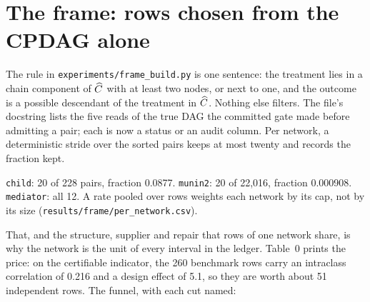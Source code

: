\section{The frame: rows chosen from the CPDAG alone}\label{sec:frame-rule}

The rule in \texttt{experiments/frame\_build.py} is one sentence: the treatment lies in a chain
component of $\widehat{C}$ with at least two nodes, or next to one, and the outcome is a possible descendant
of the treatment in $\widehat{C}$. Nothing else filters. The file's docstring lists the five reads of the
true DAG the committed gate made before admitting a pair; each is now a status or an audit column.
Per network, a deterministic stride over the sorted pairs keeps at most twenty and records the
fraction kept.

\begin{exemplo}
\texttt{child}: 20 of 228 pairs, fraction 0.0877. \texttt{munin2}: 20 of 22,016, fraction 0.000908.
\texttt{mediator}: all 12. A rate pooled over rows weights each network by its cap, not by its size
(\texttt{results/frame/per\_network.csv}).
\end{exemplo}

That, and the structure, supplier and repair that rows of one network share, is why the network is
the unit of every interval in the ledger. Table~0 prints the price: on the certifiable indicator, the 260
benchmark rows carry an intraclass correlation of 0.216 and a design effect of 5.1, so they are worth
about 51 independent rows. The funnel, with each cut named:

